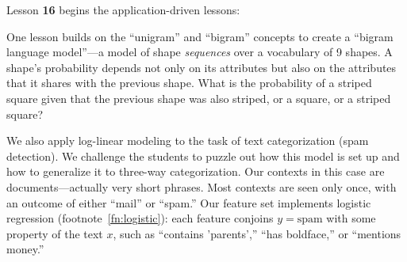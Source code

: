 \documentclass[11pt,letterpaper]{article}
\newcommand{\les}[1]{\textbf{#1}}
\begin{document}

Lesson \les{16} begins the application-driven lessons:

One lesson builds on the ``unigram'' and ``bigram'' concepts to create
a ``bigram language model''---a model of shape {\em sequences} over a
vocabulary of 9 shapes.  A shape's probability depends not only on its
attributes but also on the attributes that it shares with the previous
shape.  What is the probability of a striped square given that the
previous shape was also striped, or a square, or a striped square?


We also apply log-linear modeling to the task of text categorization
(spam detection).  We challenge the students to puzzle out how this
model is set up and how to generalize it to three-way categorization.
Our contexts in this case are documents---actually very short phrases.
Most contexts are seen only once, with an outcome of either ``mail''
or ``spam.''  Our feature set implements logistic regression
(footnote~\ref{fn:logistic}): each feature conjoins 
$y=\textrm{spam}$ with some property of the text $x$, 
such as ``contains 'parents'{},'' ``has boldface,'' or ``mentions money.''
\end{document}
